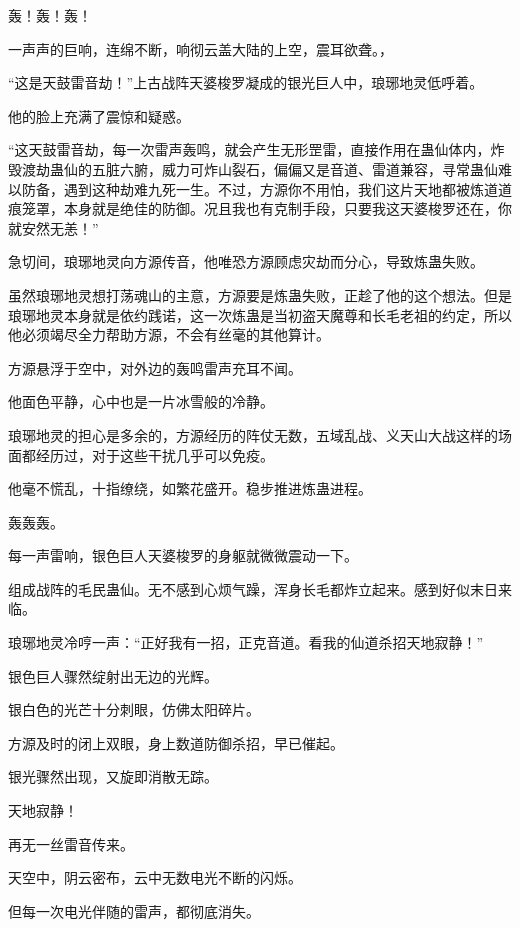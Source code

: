 
\begin{this_body}

轰！轰！轰！

一声声的巨响，连绵不断，响彻云盖大陆的上空，震耳欲聋。，

“这是天鼓雷音劫！”上古战阵天婆梭罗凝成的银光巨人中，琅琊地灵低呼着。

他的脸上充满了震惊和疑惑。

“这天鼓雷音劫，每一次雷声轰鸣，就会产生无形罡雷，直接作用在蛊仙体内，炸毁渡劫蛊仙的五脏六腑，威力可炸山裂石，偏偏又是音道、雷道兼容，寻常蛊仙难以防备，遇到这种劫难九死一生。不过，方源你不用怕，我们这片天地都被炼道道痕笼罩，本身就是绝佳的防御。况且我也有克制手段，只要我这天婆梭罗还在，你就安然无恙！”

急切间，琅琊地灵向方源传音，他唯恐方源顾虑灾劫而分心，导致炼蛊失败。

虽然琅琊地灵想打荡魂山的主意，方源要是炼蛊失败，正趁了他的这个想法。但是琅琊地灵本身就是依约践诺，这一次炼蛊是当初盗天魔尊和长毛老祖的约定，所以他必须竭尽全力帮助方源，不会有丝毫的其他算计。

方源悬浮于空中，对外边的轰鸣雷声充耳不闻。

他面色平静，心中也是一片冰雪般的冷静。

琅琊地灵的担心是多余的，方源经历的阵仗无数，五域乱战、义天山大战这样的场面都经历过，对于这些干扰几乎可以免疫。

他毫不慌乱，十指缭绕，如繁花盛开。稳步推进炼蛊进程。

轰轰轰。

每一声雷响，银色巨人天婆梭罗的身躯就微微震动一下。

组成战阵的毛民蛊仙。无不感到心烦气躁，浑身长毛都炸立起来。感到好似末日来临。

琅琊地灵冷哼一声：“正好我有一招，正克音道。看我的仙道杀招天地寂静！”

银色巨人骤然绽射出无边的光辉。

银白色的光芒十分刺眼，仿佛太阳碎片。

方源及时的闭上双眼，身上数道防御杀招，早已催起。

银光骤然出现，又旋即消散无踪。

天地寂静！

再无一丝雷音传来。

天空中，阴云密布，云中无数电光不断的闪烁。

但每一次电光伴随的雷声，都彻底消失。


\end{this_body}
